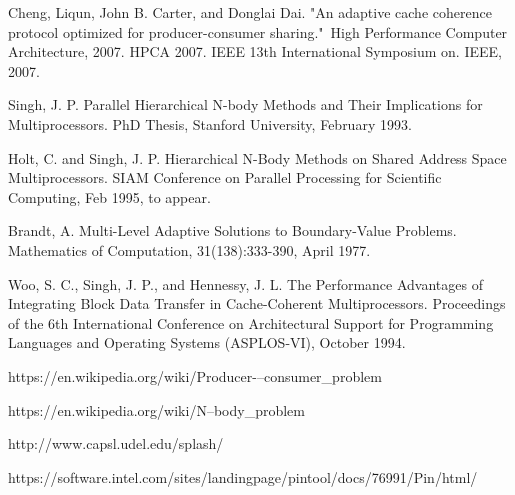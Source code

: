 \documentclass[conference]{IEEEtran}
\begin{document}
\begin{thebibliography}{1}

Cheng, Liqun, John B. Carter, and Donglai Dai. "An adaptive cache coherence protocol optimized for producer-consumer sharing." High Performance Computer Architecture, 2007. HPCA 2007. IEEE 13th International Symposium on. IEEE, 2007.

Singh, J. P.  Parallel Hierarchical N-body Methods and Their Implications for Multiprocessors.  PhD Thesis, Stanford University, February 1993.

Holt, C. and Singh, J. P.  Hierarchical N-Body Methods on Shared Address Space Multiprocessors.  SIAM Conference on Parallel Processing for Scientific Computing, Feb 1995, to appear.

Brandt, A. Multi-Level Adaptive Solutions to Boundary-Value Problems. Mathematics of Computation, 31(138):333-390, April 1977.

Woo, S. C., Singh, J. P., and Hennessy, J. L.  The Performance Advantages of Integrating Block Data Transfer in Cache-Coherent Multiprocessors. Proceedings of the 6th International Conference on Architectural Support for Programming Languages and Operating Systems (ASPLOS-VI), October 1994.

https://en.wikipedia.org/wiki/Producer-–consumer\_problem

https://en.wikipedia.org/wiki/N--body\_problem

http://www.capsl.udel.edu/splash/

https://software.intel.com/sites/landingpage/pintool/docs/76991/Pin/html/

\end{thebibliography}
\end{document}
